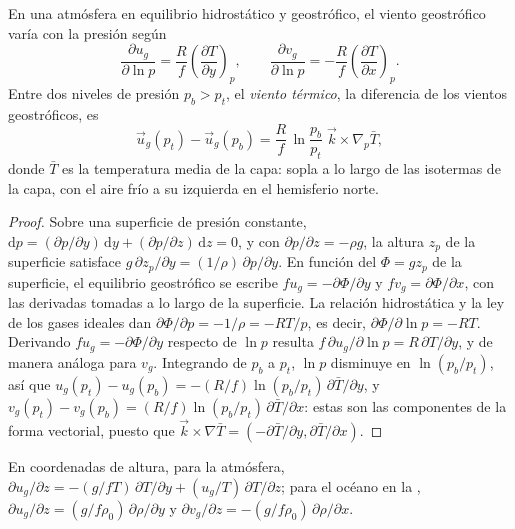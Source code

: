 \begin{theorem}\label{thm:b3:gfd-foundations:thermal-wind}
En una atmósfera en equilibrio hidrostático y geostrófico, el viento geostrófico
varía con la presión según
\[
\frac{\partial u_g}{\partial\ln p} = \frac{R}{f}\left(\frac{\partial T}{\partial y}\right)_p ,
\qquad
\frac{\partial v_g}{\partial\ln p} = -\frac{R}{f}\left(\frac{\partial T}{\partial x}\right)_p .
\]
Entre dos niveles de presión $p_b > p_t$, el \emph{viento
térmico}, la diferencia de los vientos geostróficos, es
\[
\vec u_g(p_t) - \vec u_g(p_b) = \frac{R}{f}\,\ln\frac{p_b}{p_t}\;\vec k\times\nabla_p\bar T ,
\]
donde $\bar T$ es la temperatura media de la capa: sopla a lo largo de las
isotermas de la capa, con el aire frío a su izquierda en el
hemisferio norte.
\end{theorem}

\begin{proof}
Sobre una superficie de presión constante, $\mathrm dp = (\partial p/\partial y)
\,\mathrm dy + (\partial p/\partial z)\,\mathrm dz = 0$, y con
$\partial p/\partial z = -\rho g$, la altura $z_p$ de la superficie satisface
$g\,\partial z_p/\partial y = (1/\rho)\,\partial p/\partial y$. En función del
 $\Phi = gz_p$ de la superficie, el equilibrio geostrófico se escribe
$fu_g = -\partial\Phi/\partial y$ y $fv_g = \partial\Phi/\partial x$, con
las derivadas tomadas a lo largo de la superficie. La relación hidrostática y la
ley de los gases ideales dan $\partial\Phi/\partial p = -1/\rho = -RT/p$, es decir,
$\partial\Phi/\partial\ln p = -RT$. Derivando $fu_g =
-\partial\Phi/\partial y$ respecto de $\ln p$ resulta $f\,\partial
u_g/\partial\ln p = R\,\partial T/\partial y$, y de manera análoga para $v_g$.
Integrando de $p_b$ a $p_t$, $\ln p$ disminuye en $\ln(p_b/p_t)$, así que
$u_g(p_t) - u_g(p_b) = -(R/f)\ln(p_b/p_t)\,\partial\bar T/\partial y$, y
$v_g(p_t) - v_g(p_b) = (R/f)\ln(p_b/p_t)\,\partial\bar T/\partial x$: estas
son las componentes de la forma vectorial, puesto que $\vec k\times\nabla\bar T =
(-\partial\bar T/\partial y, \partial\bar T/\partial x)$.
\end{proof}

\begin{corollary}\label{cor:b3:gfd-foundations:thermal-wind-z}
En coordenadas de altura, para la atmósfera, $\partial u_g/\partial z =
-(g/fT)\,\partial T/\partial y + (u_g/T)\,\partial T/\partial z$; para el
océano en la , $\partial u_g/\partial z =
(g/f\rho_0)\,\partial\rho/\partial y$ y $\partial v_g/\partial z =
-(g/f\rho_0)\,\partial\rho/\partial x$.
\end{corollary}

